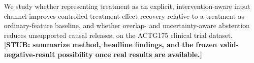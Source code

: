 We study whether representing treatment as an explicit, intervention-aware
input channel improves controlled treatment-effect recovery relative to a
treatment-as-ordinary-feature baseline, and whether overlap- and
uncertainty-aware abstention reduces unsupported causal releases, on the
ACTG175 clinical trial dataset. \textbf{[STUB: summarize method, headline
findings, and the frozen valid-negative-result possibility once real
results are available.]}
